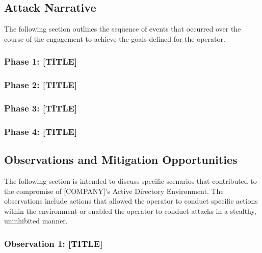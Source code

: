 \documentclass[
]{article}
\begin{document}
\subsection{Attack Narrative}\label{attack-narrative}

The following section outlines the sequence of events that occurred over
the course of the engagement to achieve the goals defined for the
operator.

\subsubsection{\texorpdfstring{Phase 1: [TITLE]}{Phase 1: [TITLE]}}\label{phase-1}

\lipsum[1-3]

\subsubsection{\texorpdfstring{Phase 2: [TITLE]}{Phase 2: [TITLE]}}\label{phase-2}
\lipsum[4-6]

\subsubsection{\texorpdfstring{Phase 3: [TITLE]}{Phase 3: [TITLE}}\label{phase-3}

\lipsum[7-9]


\subsubsection{\texorpdfstring{Phase 4: [TITLE]}{Phase 4: [TITLE]}}\label{phase-4}
\lipsum[10-14]

\pagebreak

\subsection{Observations and Mitigation
Opportunities}\label{observations-and-mitigation-opportunities}

The following section is intended to discuss specific scenarios that
contributed to the compromise of [COMPANY]'s
Active Directory Environment. The observations include actions that
allowed the operator to conduct specific actions within the environment
or enabled the operator to conduct attacks in a stealthy, uninhibited
manner.

\subsubsection{Observation 1: [TITLE]}\label{observation-1}
\end{document}
